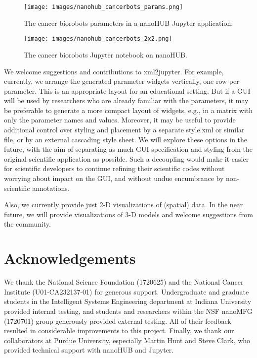 \documentclass[10pt,letterpaper]{article}
\begin{document}
\begin{figure}
\centering
\texttt{[image: images/nanohub\_cancerbots\_params.png]}
\captionsetup{justification=centering}
\caption{The cancer biorobots parameters in a nanoHUB Jupyter
application.}
\end{figure}

\begin{figure}
\centering
\texttt{[image: images/nanohub\_cancerbots\_2x2.png]}
\captionsetup{justification=centering}
\caption{The cancer biorobots Jupyter notebook on nanoHUB.}
\end{figure}

We welcome suggestions and contributions to xml2jupyter. For example,
currently, we arrange the generated parameter widgets vertically, one
row per parameter. This is an appropriate layout for an educational
setting. But if a GUI will be used by researchers who are already
familiar with the parameters, it may be preferable to generate a more
compact layout of widgets, e.g., in a matrix with only the parameter
names and values. Moreover, it may be useful to provide additional
control over styling and placement by a separate style.xml or similar
file, or by an external cascading style sheet. We will explore these
options in the future, with the aim of separating as much GUI
specification and styling from the original scientific application as
possible. Such a decoupling would make it easier for scientific
developers to continue refining their scientific codes without worrying
about impact on the GUI, and without undue encumbrance by non-scientific
annotations.

Also, we currently provide just 2-D visualizations of (spatial) data. In
the near future, we will provide visualizations of 3-D models and
welcome suggestions from the community.

\hypertarget{acknowledgements}{%
\section{Acknowledgements}\label{acknowledgements}}

We thank the National Science Foundation (1720625) and the National
Cancer Institute (U01-CA232137-01) for generous support. Undergraduate
and graduate students in the Intelligent Systems Engineering department
at Indiana University provided internal testing, and students and
researchers within the NSF nanoMFG (1720701) group generously provided
external testing. All of their feedback resulted in considerable
improvements to this project. Finally, we thank our collaborators at
Purdue University, especially Martin Hunt and Steve Clark, who provided
technical support with nanoHUB and Jupyter.

\newpage

\end{document}
